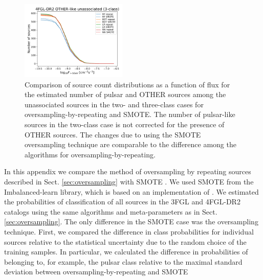 \documentclass[referee]{aa} %
\begin{document}
\begin{appendix}
\begin{figure}[h]
\includegraphics[width=0.45\textwidth]{plots/oversample/N_logS_4FGL-DR2_OTHER_3classes_O_vs_S.pdf}
\caption{Comparison of source count distributions as a function of flux for the estimated number of pulsar and OTHER sources
among the unassociated sources in the two- and three-class cases for oversampling-by-repeating and SMOTE.
The number of pulsar-like sources in the two-class case is not corrected for the presence of OTHER sources.
The changes due to using the SMOTE oversampling technique are comparable to the difference among the algorithms
for oversampling-by-repeating.
}
\label{fig:S_vs_O_NlogS}
\end{figure}

In this appendix we compare the method of oversampling by repeating sources described in Sect. \ref{sec:oversampling} 
with SMOTE \citep{Chawla_2002}. We used SMOTE from the Imbalanced-learn library, which is based on an implementation of \citet{Chawla_2002}. 
We estimated the probabilities of classification of all sources in the 3FGL and 4FGL-DR2 catalogs using the same algorithms and meta-parameters as in Sect. \ref{sec:oversampling}.
The only difference in the SMOTE case was the oversampling technique.
First, we compared the difference in class probabilities for individual sources relative to the statistical uncertainty due to the random choice of the training samples.
In particular, we calculated the difference in probabilities of belonging to, for example, the pulsar class relative to the maximal standard deviation
between oversampling-by-repeating and SMOTE


\end{appendix}
\end{document}
